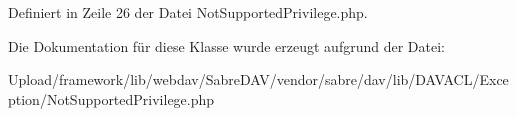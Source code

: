 Definiert in Zeile 26 der Datei Not\+Supported\+Privilege.\+php.



Die Dokumentation für diese Klasse wurde erzeugt aufgrund der Datei\+:\begin{DoxyCompactItemize}
\item 
Upload/framework/lib/webdav/\+Sabre\+D\+A\+V/vendor/sabre/dav/lib/\+D\+A\+V\+A\+C\+L/\+Exception/Not\+Supported\+Privilege.\+php\end{DoxyCompactItemize}
